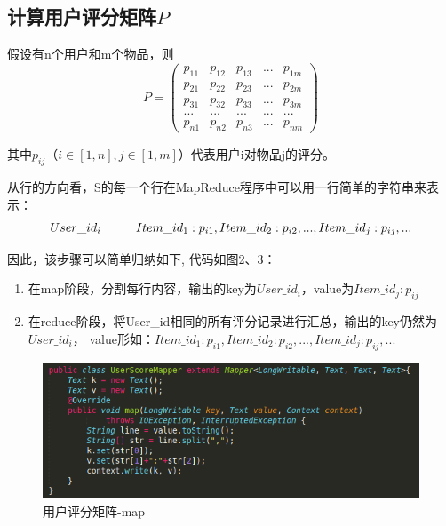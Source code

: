 \documentclass[12pt, a4paper]{article}
\newcommand\tab[1][1cm]{\hspace*{#1}}
\begin{document}
\subsection{计算用户评分矩阵$P$}
假设有n个用户和m个物品，则
\begin{equation}       %
P =
\left(
  \begin{array}{ccccc}
    p_{11}  & p_{12}  & p_{13}  & ... & p_{1m}\\
    p_{21}  & p_{22}  & p_{23}  & ... & p_{2m}\\
    p_{31}  & p_{32}  & p_{33}  & ... & p_{3m}\\
    ...     & ...     & ...     & ... & ...\\
    p_{n1}  & p_{n2}  & p_{n3}  & ... & p_{nm}
  \end{array}
\right)
\end{equation}
\par 其中$p_{ij}$（$i \in [1,n], j \in [1,m]$）代表用户i对物品j的评分。
\par 从行的方向看，S的每一个行在MapReduce程序中可以用一行简单的字符串来表示：
\begin{equation}
  User\_id_i \tab Item\_id_1:p_{i1},Item\_id_2:p_{i2},...,Item\_id_j:p_{ij},...
\end{equation}
\par 因此，该步骤可以简单归纳如下, 代码如图2、3：
\begin{enumerate}
  \item 在map阶段，分割每行内容，输出的key为$User\_id_i$，value为$Item\_id_j:p_{ij}$
  \item 在reduce阶段，将User\_id相同的所有评分记录进行汇总，输出的key仍然为$User\_id_i$，
  value形如：$Item\_id_1:p_{i1},Item\_id_2:p_{i2},...,Item\_id_j:p_{ij},...$
\end{enumerate}
\begin{figure}[ht]
\centering
\includegraphics[scale=0.5]{m1.png}
\caption{用户评分矩阵-map}
\end{figure}
\end{document}
